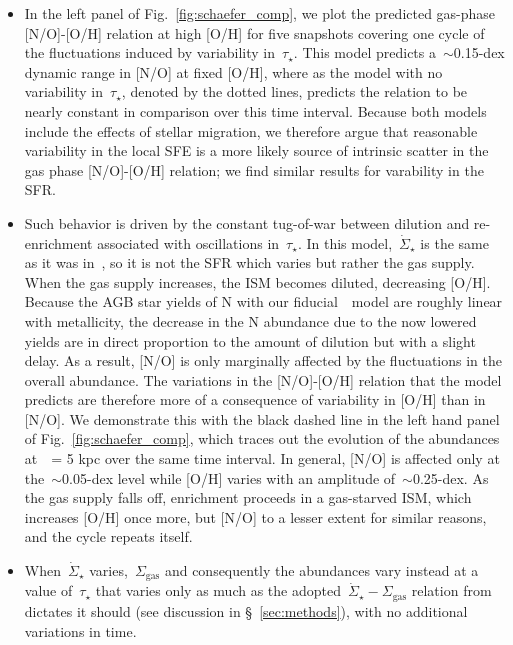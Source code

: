 \documentclass[ms.tex]{subfiles}
\begin{document}
\begin{itemize}
	\item In the left panel of Fig.~\ref{fig:schaefer_comp}, we plot the 
	predicted gas-phase [N/O]-[O/H] relation at high [O/H] for five snapshots 
	covering one cycle of the fluctuations induced by variability 
	in~$\tau_\star$. 
	This model predicts a~$\sim$0.15-dex dynamic range in [N/O] at fixed [O/H], 
	where as the model with no variability in~$\tau_\star$, denoted by the 
	dotted lines, predicts the relation to be nearly constant in comparison 
	over this time interval. 
	Because both models include the effects of stellar migration, we therefore 
	argue that reasonable variability in the local SFE is a more likely source 
	of intrinsic scatter in the gas phase [N/O]-[O/H] relation; we find 
	similar results for varability in the SFR. 

	\item Such behavior is driven by the constant tug-of-war between dilution 
	and re-enrichment associated with oscillations in~$\tau_\star$. 
	In this model,~$\dot{\Sigma}_\star$ is the same as it was 
	in~\citet{Johnson2021}, so it is not the SFR which varies but rather the 
	gas supply. 
	When the gas supply increases, the ISM becomes diluted, decreasing [O/H]. 
	Because the AGB star yields of N with our fiducial~\cristallo~model are 
	roughly linear with metallicity, the decrease in the N abundance due to the 
	now lowered yields are in direct proportion to the amount of dilution but 
	with a slight delay. 
	As a result, [N/O] is only marginally affected by the fluctuations in the 
	overall abundance. 
	The variations in the [N/O]-[O/H] relation that the model predicts are 
	therefore more of a consequence of variability in [O/H] than in [N/O]. 
	We demonstrate this with the black dashed line in the left hand panel of 
	Fig.~\ref{fig:schaefer_comp}, which traces out the evolution of the 
	abundances at~\rgal~= 5 kpc over the same time interval. 
	In general, [N/O] is affected only at the~$\sim$0.05-dex level while 
	[O/H] varies with an amplitude of~$\sim$0.25-dex. 
	As the gas supply falls off, enrichment proceeds in a gas-starved ISM, 
	which increases [O/H] once more, but [N/O] to a lesser extent for similar 
	reasons, and the cycle repeats itself. 

	\item When~$\dot{\Sigma}_\star$ varies,~$\Sigma_\text{gas}$ and 
	consequently the abundances vary instead at a value of~$\tau_\star$ that 
	varies only as much as the adopted~$\dot{\Sigma}_\star - \Sigma_\text{gas}$ 
	relation from~\citet{Johnson2021} dictates it should (see discussion in 
	\S~\ref{sec:methods}), with no additional variations in time. 


\end{itemize}
\end{document}
